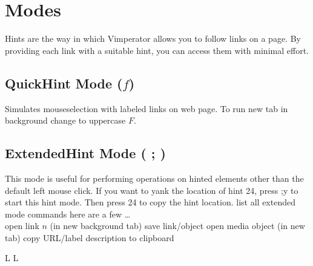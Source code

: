 \section{Modes}{Hints are the way in which Vimperator allows you to follow links on a page. By
    providing each link with a suitable hint, you can access them with minimal effort. }
        \subsection{QuickHint Mode ($f$)}{Simulates mouseselection with labeled
            links on web page. To run new tab in background change to uppercase $F$.}
            \subsection{ExtendedHint Mode ( ; )}{This mode is useful for
                performing operations on hinted elements other than the default
                    left mouse click. If you want to yank the location of hint 24, press ;y to start this hint
                    mode. Then press 24 to copy the hint location.}
                    	{list all extended mode commands}
                    here are a few \ldots\\
                        	{open link $n$ (in new background tab)}
                        	{save link/object}
                        	{open media object (in new tab)}
                        	{copy URL/label description to clipboard}

\copyrightnotice

\vfil
\supereject
\if L\lr \else\null\vfill\eject\fi
\if L\lr \else\null\vfill\eject\fi
\bye


